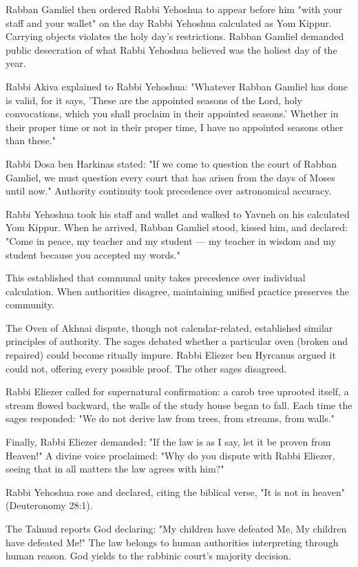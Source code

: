 Rabban Gamliel then ordered Rabbi Yehoshua to appear before him "with your staff and your wallet" on the day Rabbi Yehoshua calculated as Yom Kippur. Carrying objects violates the holy day's restrictions. Rabban Gamliel demanded public desecration of what Rabbi Yehoshua believed was the holiest day of the year.

Rabbi Akiva explained to Rabbi Yehoshua: "Whatever Rabban Gamliel has done is valid, for it says, 'These are the appointed seasons of the Lord, holy convocations, which you shall proclaim in their appointed seasons.' Whether in their proper time or not in their proper time, I have no appointed seasons other than these."

Rabbi Dosa ben Harkinas stated: "If we come to question the court of Rabban Gamliel, we must question every court that has arisen from the days of Moses until now." Authority continuity took precedence over astronomical accuracy.

Rabbi Yehoshua took his staff and wallet and walked to Yavneh on his calculated Yom Kippur. When he arrived, Rabban Gamliel stood, kissed him, and declared: "Come in peace, my teacher and my student — my teacher in wisdom and my student because you accepted my words."

This established that communal unity takes precedence over individual calculation. When authorities disagree, maintaining unified practice preserves the community.

The Oven of Akhnai dispute, though not calendar-related, established similar principles of authority. The sages debated whether a particular oven (broken and repaired) could become ritually impure. Rabbi Eliezer ben Hyrcanus argued it could not, offering every possible proof. The other sages disagreed.

Rabbi Eliezer called for supernatural confirmation: a carob tree uprooted itself, a stream flowed backward, the walls of the study house began to fall. Each time the sages responded: "We do not derive law from trees, from streams, from walls."

Finally, Rabbi Eliezer demanded: "If the law is as I say, let it be proven from Heaven!" A divine voice proclaimed: "Why do you dispute with Rabbi Eliezer, seeing that in all matters the law agrees with him?"

Rabbi Yehoshua rose and declared, citing the biblical verse, "It is not in heaven" (Deuteronomy 28:1).

The Talmud reports God declaring: "My children have defeated Me, My children have defeated Me!" The law belongs to human authorities interpreting through human reason. God yields to the rabbinic court's majority decision.

